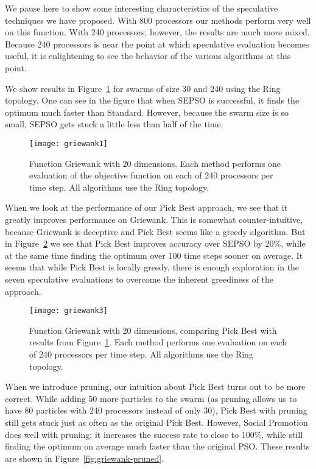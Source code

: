 \documentclass[ms,electronic,twosidetoc,letterpaper,chaptercenter,parttop,equalmargins]{byumsphd}
\newcommand{\fig}[1]{Figure~\ref{fig:#1}}
\begin{document}
We pause here to show some interesting characteristics of the speculative
techniques we have proposed.  With 800 processors our methods perform very well
on this function.  With 240 processors, however, the results are much more
mixed.  Because 240 processors is near the point at which speculative
evaluation becomes useful, it is enlightening to see the behavior of the
various algorithms at this point.

We show results in \fig{basic-griewank2} for swarms of size 30 and 240 using
the Ring topology.  One can see in the figure that when SEPSO is successful, it
finds the optimum much faster than Standard.  However, because the swarm size
is so small, SEPSO gets stuck a little less than half of the time.

\begin{figure}
  \centering
  \texttt{[image: griewank1]}
  \caption{Function Griewank with 20 dimensions.  Each method performs one
  evaluation of the objective function on each of 240 processors per time step.
  All algorithms use the Ring topology.}
  \label{fig:basic-griewank2}
\end{figure}

When we look at the performance of our Pick Best approach, we see that it
greatly improves performance on Griewank.  This is somewhat counter-intuitive,
because Griewank is deceptive and Pick Best seems like a greedy algorithm.  But
in \fig{griewank-pickbest} we see that Pick Best improves accuracy over SEPSO
by 20\%, while at the same time finding the optimum over 100 time steps sooner
on average.  It seems that while Pick Best is locally greedy, there is enough
exploration in the seven speculative evaluations to overcome the inherent
greediness of the approach.

\begin{figure}
  \centering
  \texttt{[image: griewank3]}
  \caption{Function Griewank with 20 dimensions, comparing Pick Best with
  results from \fig{basic-griewank2}.  Each method performs one evaluation on
  each of 240 processors per time step.  All algorithms use the Ring topology.}
  \label{fig:griewank-pickbest}
\end{figure}

When we introduce pruning, our intuition about Pick Best turns out to be more
correct.  While adding 50 more particles to the swarm (as pruning allows us to
have 80 particles with 240 processors instead of only 30), Pick Best with
pruning still gets stuck just as often as the original Pick Best.  However,
Social Promotion does well with pruning; it increases the success rate to close
to 100\%, while still finding the optimum on average much faster than the
original PSO.  These results are shown in \fig{griewank-pruned}.
\end{document}
